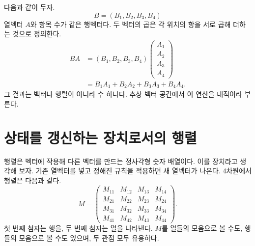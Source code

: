 \begin{classroomqa}
\end{classroomqa}

다음과 같이 두자.
\begin{equation}
  B=(B_1,B_2,B_3,B_4)
\end{equation}
열벡터 \(A\)와 항목 수가 같은 행벡터다. 두 벡터의 곱은 각 위치의 항을 서로 곱해 더하는 것으로 정의한다.
\begin{align}
  BA
  &=
  (B_1,B_2,B_3,B_4)
  \begin{pmatrix}
    A_1\\ A_2\\ A_3\\ A_4
  \end{pmatrix}\\
  &=B_1A_1+B_2A_2+B_3A_3+B_4A_4.
  \label{eq:l01-inner-product}
\end{align}
그 결과는 벡터나 행렬이 아니라 수 하나다. 추상 벡터 공간에서 이 연산을 내적이라 부른다.

\begin{classroomqa}
\end{classroomqa}

\section{상태를 갱신하는 장치로서의 행렬}

행렬은 벡터에 작용해 다른 벡터를 만드는 정사각형 숫자 배열이다. 이를 장치라고 생각해 보자. 기존 열벡터를 넣고 정해진 규칙을 적용하면 새 열벡터가 나온다. 4차원에서 행렬은 다음과 같다.
\begin{equation}
  M=
  \begin{pmatrix}
    M_{11}&M_{12}&M_{13}&M_{14}\\
    M_{21}&M_{22}&M_{23}&M_{24}\\
    M_{31}&M_{32}&M_{33}&M_{34}\\
    M_{41}&M_{42}&M_{43}&M_{44}
  \end{pmatrix}.
  \label{eq:l01-general-matrix}
\end{equation}
첫 번째 첨자는 행을, 두 번째 첨자는 열을 나타낸다. \(M\)를 열들의 모음으로 볼 수도, 행들의 모음으로 볼 수도 있으며, 두 관점 모두 유용하다.

